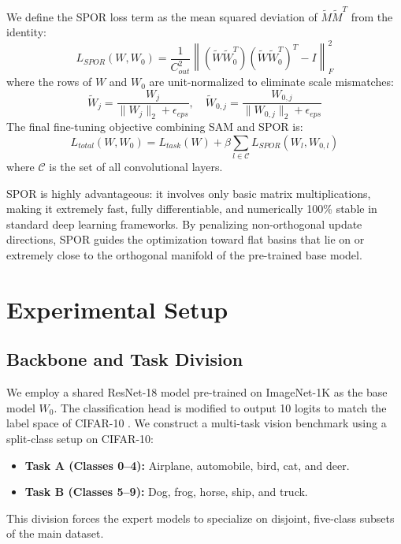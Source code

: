 \documentclass{article}
\theoremstyle{plain}
\theoremstyle{definition}
\theoremstyle{remark}
\begin{document}
We define the SPOR loss term as the mean squared deviation of $\tilde{M} \tilde{M}^T$ from the identity:
\begin{equation}
    L_{SPOR}(W, W_0) = \frac{1}{C_{out}^2} \left\| (\tilde{W} \tilde{W}_0^T)(\tilde{W} \tilde{W}_0^T)^T - I \right\|_F^2
\end{equation}
where the rows of $W$ and $W_0$ are unit-normalized to eliminate scale mismatches:
\begin{equation}
    \tilde{W}_{j} = \frac{W_{j}}{\|W_{j}\|_2 + \epsilon_{eps}}, \quad \tilde{W}_{0,j} = \frac{W_{0,j}}{\|W_{0,j}\|_2 + \epsilon_{eps}}
\end{equation}
The final fine-tuning objective combining SAM and SPOR is:
\begin{equation}
    L_{total}(W, W_0) = L_{task}(W) + \beta \sum_{l \in \mathcal{C}} L_{SPOR}(W_l, W_{0,l})
\end{equation}
where $\mathcal{C}$ is the set of all convolutional layers.

SPOR is highly advantageous: it involves only basic matrix multiplications, making it extremely fast, fully differentiable, and numerically 100\% stable in standard deep learning frameworks. By penalizing non-orthogonal update directions, SPOR guides the optimization toward flat basins that lie on or extremely close to the orthogonal manifold of the pre-trained base model.

\section{Experimental Setup}
\label{sec:experiments}

\subsection{Backbone and Task Division}
We employ a shared ResNet-18 model \cite{he2016deep} pre-trained on ImageNet-1K as the base model $W_0$. The classification head is modified to output 10 logits to match the label space of CIFAR-10 \cite{krizhevsky2009learning}.
We construct a multi-task vision benchmark using a split-class setup on CIFAR-10:
\begin{itemize}
    \item \textbf{Task A (Classes 0--4):} Airplane, automobile, bird, cat, and deer.
    \item \textbf{Task B (Classes 5--9):} Dog, frog, horse, ship, and truck.
\end{itemize}
This division forces the expert models to specialize on disjoint, five-class subsets of the main dataset.
\end{document}
